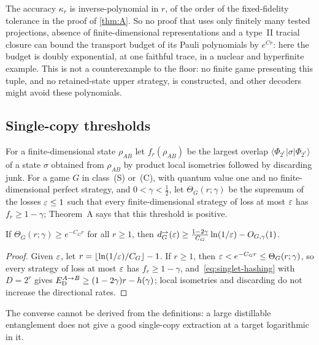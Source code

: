 The accuracy $\kappa_r$ is inverse-polynomial in $r$, of the order of the fixed-fidelity tolerance in the proof of \cref{thm:A}. So no proof
that uses only finitely many tested projections, absence of finite-dimensional representations and a type~II tracial closure can bound
the transport budget of its Pauli polynomials by $e^{Cr}$: here the budget is doubly exponential, at one faithful trace, in a nuclear and
hyperfinite example. This is not a counterexample to the floor: no finite game presenting this tuple, and no retained-state upper
strategy, is constructed, and other decoders might avoid these polynomials.

\subsection{Single-copy thresholds}\label{app:floor-threshold}

For a finite-dimensional state $\rho_{AB}$ let $f_r(\rho_{AB})$ be the largest overlap $\langle\Phi_{2^r}|\sigma|\Phi_{2^r}\rangle$ of a state $\sigma$
obtained from $\rho_{AB}$ by product local isometries followed by discarding junk. For a game $G$ in class~(S) or~(C), with quantum
value one and no finite-dimensional perfect strategy, and $0<\gamma<\frac12$, let $\Theta_G(r;\gamma)$ be the supremum of the losses
$\varepsilon\le1$ such that every finite-dimensional strategy of loss at most $\varepsilon$ has $f_r\ge1-\gamma$; Theorem~A says that this threshold
is positive.

\begin{proposition}\label{prop:threshold}
If $\Theta_G(r;\gamma)\ge e^{-C_Gr}$ for all $r\ge1$, then $d^\to_G(\varepsilon)\ge\frac{1-2\gamma}{C_G}\ln(1/\varepsilon)-O_{G,\gamma}(1)$.
\end{proposition}

\begin{proof}
Given $\varepsilon$, let $r=\lfloor\ln(1/\varepsilon)/C_G\rfloor-1$. If $r\ge1$, then $\varepsilon<e^{-C_Gr}\le\Theta_G(r;\gamma)$, so every strategy of loss at
most $\varepsilon$ has $f_r\ge1-\gamma$,
and~\eqref{eq:singlet-hashing} with $D=2^r$ gives $E_{\mathrm D}^{A\to B}\ge(1-2\gamma)r-h(\gamma)$; local isometries and discarding do not increase the
directional rates.
\end{proof}

The converse cannot be derived from the definitions: a large distillable entanglement does not give a good single-copy extraction at
a target logarithmic in it.

